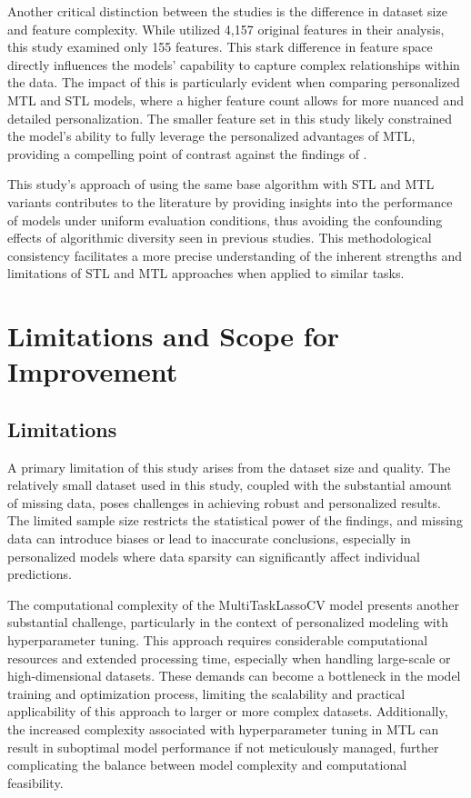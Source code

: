 Another critical distinction between the studies is the difference in dataset size and feature complexity. While \citet{tseng2020using} utilized 4,157 original features in their analysis, this study examined only 155 features. This stark difference in feature space directly influences the models' capability to capture complex relationships within the data. The impact of this is particularly evident when comparing personalized MTL and STL models, where a higher feature count allows for more nuanced and detailed personalization. The smaller feature set in this study likely constrained the model's ability to fully leverage the personalized advantages of MTL, providing a compelling point of contrast against the findings of \citet{tseng2020using}.

This study’s approach of using the same base algorithm with STL and MTL variants contributes to the literature by providing insights into the performance of models under uniform evaluation conditions, thus avoiding the confounding effects of algorithmic diversity seen in previous studies. This methodological consistency facilitates a more precise understanding of the inherent strengths and limitations of STL and MTL approaches when applied to similar tasks.


\section{Limitations and Scope for Improvement}
\subsection{Limitations}

A primary limitation of this study arises from the dataset size and quality. The relatively small dataset used in this study, coupled with the substantial amount of missing data, poses challenges in achieving robust and personalized results. The limited sample size restricts the statistical power of the findings, and missing data can introduce biases or lead to inaccurate conclusions, especially in personalized models where data sparsity can significantly affect individual predictions.


The computational complexity of the MultiTaskLassoCV model presents another substantial challenge, particularly in the context of personalized modeling with hyperparameter tuning. This approach requires considerable computational resources and extended processing time, especially when handling large-scale or high-dimensional datasets. These demands can become a bottleneck in the model training and optimization process, limiting the scalability and practical applicability of this approach to larger or more complex datasets. Additionally, the increased complexity associated with hyperparameter tuning in MTL can result in suboptimal model performance if not meticulously managed, further complicating the balance between model complexity and computational feasibility.



